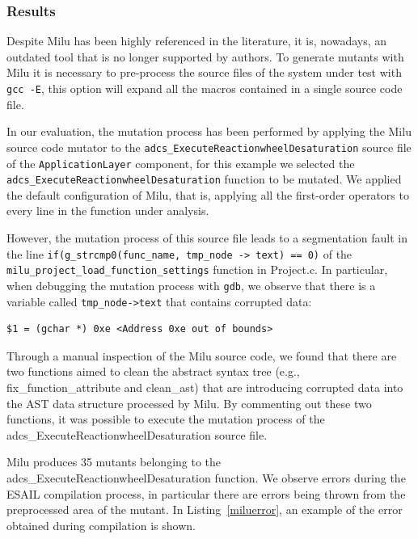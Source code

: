 \subsubsection{Results}

Despite Milu has been highly referenced in the literature, it is, nowadays, an outdated tool that is no longer supported by authors.
To generate mutants with Milu it is necessary to pre-process the source files of the system under test with \texttt{gcc -E}, this option will expand all the macros contained in a single source code file.

In our evaluation, the mutation process has been performed by applying the Milu source code mutator to the \texttt{adcs\_ExecuteReactionwheelDesaturation} source file of the \texttt{ApplicationLayer} component, for this example we selected the \linebreak\texttt{adcs\_ExecuteReactionwheelDesaturation} function to be mutated. We applied the default configuration of Milu, that is, applying all the first-order operators to every line in the function under analysis.

However, the mutation process of this source file leads to a segmentation fault in the line \texttt{if(g\_strcmp0(func\_name, tmp\_node -> text) == 0)} of the \linebreak\texttt{milu\_project\_load\_function\_settings} function in Project.c. In particular, when debugging the mutation process with \texttt{gdb}, we observe that there is a variable called \texttt{tmp\_node->text} that contains corrupted data:

\noindent\begin{minipage}{0.8\textwidth}
\begin{lstlisting}[language={}]
$1 = (gchar *) 0xe <Address 0xe out of bounds>
\end{lstlisting}
\end{minipage}

Through a manual inspection of the Milu source code, we found that there are two functions aimed to clean the abstract syntax tree (e.g., fix\_function\_attribute and clean\_ast) that are introducing corrupted data into the AST data structure processed by Milu.
By commenting out these two functions, it was possible to execute the mutation process of the adcs\_ExecuteReactionwheelDesaturation source file. 

Milu produces 35 mutants belonging to the adcs\_ExecuteReactionwheelDesaturation function.
 We observe errors during the ESAIL compilation process, in particular there are errors being thrown from the preprocessed area of the mutant. In Listing~\ref{miluerror}, an example of the error obtained during compilation is shown.

